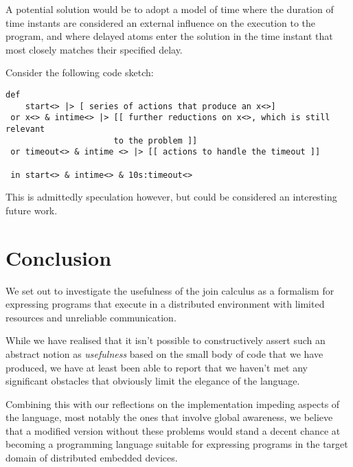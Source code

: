 A potential solution would be to adopt a model of time where the duration of
time instants are considered an external influence on the execution to the
program, and where delayed atoms enter the solution in the time instant that
most closely matches their specified delay.

Consider the following code sketch:
\begin{verbatim}
def
    start<> |> [ series of actions that produce an x<>]
 or x<> & intime<> |> [[ further reductions on x<>, which is still relevant
                      to the problem ]]
 or timeout<> & intime <> |> [[ actions to handle the timeout ]]

 in start<> & intime<> & 10s:timeout<>
\end{verbatim}

This is admittedly speculation however, but could be considered an interesting
future work.

\section{Conclusion}

We set out to investigate the usefulness of the join calculus as a
formalism for expressing programs that execute in a distributed environment with
limited resources and unreliable communication.

While we have realised that it isn't possible to constructively assert such an
abstract notion as \emph{usefulness} based on the small body of code that we have
produced, we have at least been able to report that we haven't met any
significant obstacles that obviously limit the elegance of the language.

Combining this with our reflections on the implementation impeding aspects of
the language, most notably the ones that involve global awareness, we believe
that a modified version without these problems would stand a decent chance at
becoming a programming language suitable for expressing programs in the
target domain of distributed embedded devices.
